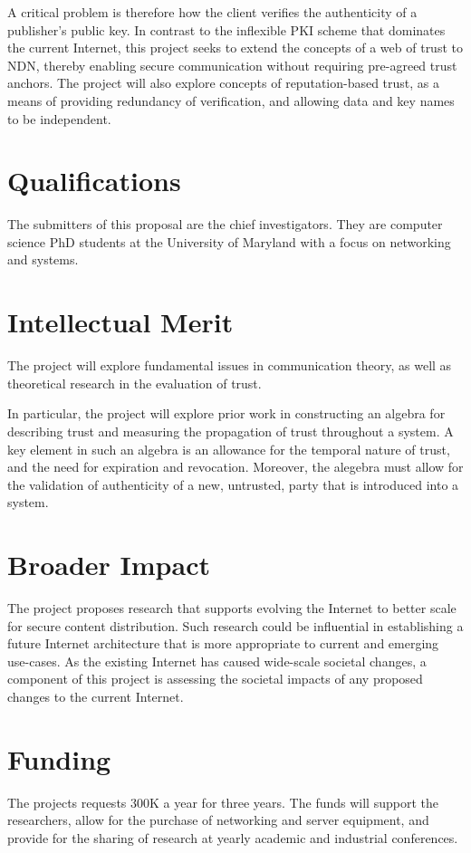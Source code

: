 \documentclass[letterpaper,twocolumn,10pt]{article}
\begin{document}
A critical problem is therefore how the client verifies the authenticity of a
publisher's public key.  In contrast to the inflexible PKI scheme that
dominates the current Internet, this project seeks to extend the concepts of a
web of trust to NDN, thereby enabling secure communication without requiring
pre-agreed trust anchors.  The project will also explore concepts of
reputation-based trust, as a means of providing redundancy of verification, and
allowing data and key names to be independent.

\section*{Qualifications}
The submitters of this proposal are the chief investigators.  They are computer
science PhD students at the University of Maryland with a focus on networking
and systems. 

\section*{Intellectual Merit}
The project will explore fundamental issues in communication theory, as well as
theoretical research in the evaluation of trust.  

In particular, the project will explore prior work in constructing an algebra
for describing trust and measuring the propagation of trust throughout a
system.  A key element in such an algebra is an allowance for the temporal
nature of trust, and the need for expiration and revocation.  Moreover, the
alegebra must allow for the validation of authenticity of a new, untrusted, party
that is introduced into a system.

\section*{Broader Impact}
The project proposes research that supports evolving the Internet to better
scale for secure content distribution.  Such research could be influential in
establishing a future Internet architecture that is more appropriate to current
and emerging use-cases.  As the existing Internet has caused wide-scale
societal changes, a component of this project is assessing the societal impacts
of any proposed changes to the current Internet.

\section*{Funding}
The projects requests 300K a year for three years.  The funds will support the
researchers, allow for the purchase of networking and server equipment, and
provide for the sharing of research at yearly academic and industrial
conferences.
\end{document}
